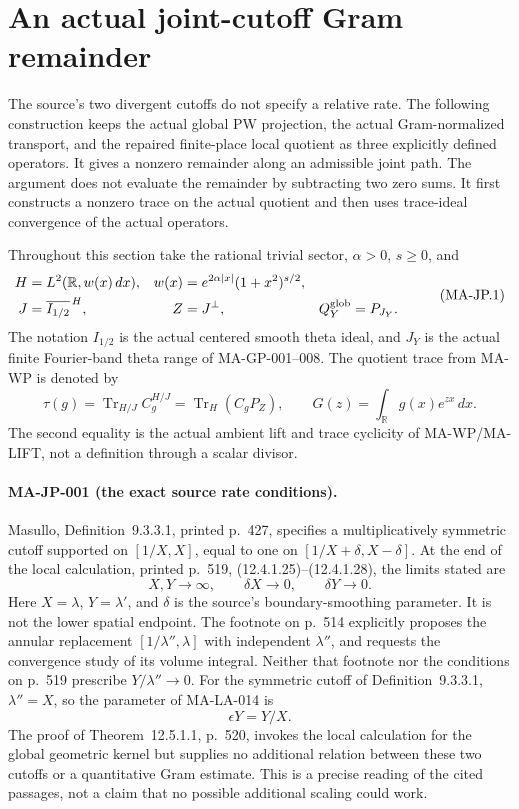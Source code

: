 \section{An actual joint-cutoff Gram remainder}
\label{sec:joint-cutoff-counterpath}

The source's two divergent cutoffs do not specify a relative rate.
The following construction keeps the actual global PW projection,
the actual Gram-normalized transport, and the repaired finite-place
local quotient as three explicitly defined operators.  It gives a
nonzero remainder along an admissible joint path.  The argument
does not evaluate the remainder by subtracting two zero sums.
It first constructs a nonzero trace on the actual quotient and
then uses trace-ideal convergence of the actual operators.

Throughout this section take the rational trivial sector,
$\alpha>0$, $s\ge0$, and
\[
 \begin{aligned}
 H&=L^2(\mathbb R,w(x)\,dx),&
 w(x)&=e^{2\alpha|x|}(1+x^2)^{s/2},\\
 J&=\overline{I_{1/2}}^{\,H},&
 Z&=J^\perp,&
 Q_Y^{\rm glob}&=P_{J_Y}.
 \end{aligned}
 \tag{MA-JP.1}
\]
The notation $I_{1/2}$ is the actual centered smooth theta ideal,
and $J_Y$ is the actual finite Fourier-band theta range of
MA-GP-001--008.  The quotient trace from MA-WP is denoted by
\[
 \tau(g)=\operatorname{Tr}_{H/J}C_g^{H/J}
        =\operatorname{Tr}_H(C_gP_Z),
 \qquad
 G(z)=\int_{\mathbb R}g(x)e^{zx}\,dx .
 \tag{MA-JP.2}
\]
The second equality is the actual ambient lift and trace cyclicity
of MA-WP/MA-LIFT, not a definition through a scalar divisor.

\paragraph{MA-JP-001 (the exact source rate conditions).}
Masullo, Definition~9.3.3.1, printed p.~427, specifies a
multiplicatively symmetric cutoff supported on $[1/X,X]$,
equal to one on $[1/X+\delta,X-\delta]$.
At the end of the local calculation, printed p.~519,
(12.4.1.25)--(12.4.1.28), the limits stated are
\[
       X,Y\longrightarrow\infty,\qquad
       \delta X\longrightarrow0,\qquad
       \delta Y\longrightarrow0 .
 \tag{MA-JP.3}
\]
Here $X=\lambda$, $Y=\lambda'$, and $\delta$ is the source's
boundary-smoothing parameter.  It is not the lower spatial
endpoint.  The footnote on p.~514 explicitly proposes the
annular replacement $[1/\lambda'',\lambda]$ with independent
$\lambda''$, and requests the convergence study of its volume
integral.  Neither that footnote nor the conditions on p.~519
prescribe $Y/\lambda''\to0$.  For the symmetric cutoff of
Definition~9.3.3.1, $\lambda''=X$, so the parameter of
MA-LA-014 is
\[
                     \epsilon Y=Y/X.
 \tag{MA-JP.4}
\]
The proof of Theorem~12.5.1.1, p.~520, invokes the local
calculation for the global geometric kernel but supplies no
additional relation between these two cutoffs or a quantitative
Gram estimate.  This is a precise reading of the cited passages,
not a claim that no possible additional scaling could work.

